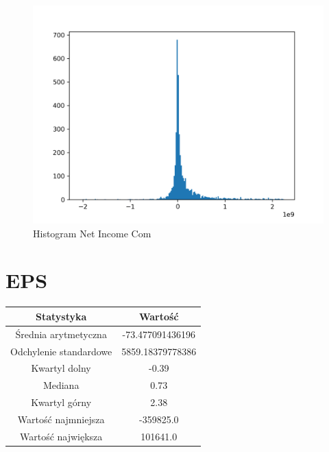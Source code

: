 \documentclass{article}
\begin{document}
\begin{figure}[h!]
    \includegraphics[width=\linewidth]{variables/Net Income Com.png}
    \caption{Histogram Net Income Com }
\end{figure}\section{ EPS }

\begin{center}
    \begin{tabular}{|c | c|} 
    \hline
    Statystyka & Wartość \\
    \hline\hline
    Średnia arytmetyczna & -73.477091436196 \\ 
    \hline
    Odchylenie standardowe & 5859.18379778386 \\
    \hline
    Kwartyl dolny & -0.39 \\
    \hline
    Mediana & 0.73 \\
    \hline
    Kwartyl górny & 2.38 \\
    \hline
    Wartość najmniejsza & -359825.0 \\
    \hline
    Wartość największa & 101641.0 \\
    \hline
   \end{tabular}
\end{center}
\end{document}
